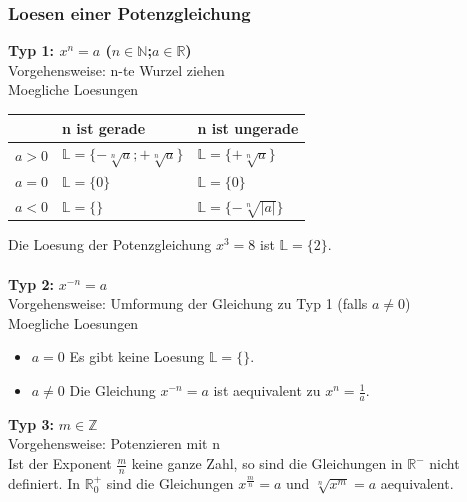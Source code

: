 \begin{multicols}{2}
    \subsubsection{Loesen einer Potenzgleichung}
    \vspace{-4mm}
    \textbf{Typ 1:  $x^n = a$ ($n \in \mathbb{N}$;$a \in \mathbb{R}$)} \\
    Vorgehensweise: n-te Wurzel ziehen\\
    Moegliche Loesungen \\
    \begin{tabularx}{0.5\textwidth} {
            | >{\raggedright\arraybackslash}c
            | >{\raggedright\arraybackslash}X
            | >{\raggedright\arraybackslash}X |}
        \hline
        \textbf{} & \textbf{n ist gerade}                        & \textbf{n ist ungerade}           \\ \hline
        $a > 0$   & $\mathbb{L} = \{-\sqrt[n]{a};+\sqrt[n]{a}\}$ & $\mathbb{L} = \{+\sqrt[n]{a}\}$   \\ \hline
        $a = 0$   & $\mathbb{L} = \{0\}$                         & $\mathbb{L} = \{0\}$              \\ \hline
        $a < 0$   & $\mathbb{L} = \{\}$                          & $\mathbb{L} = \{-\sqrt[n]{|a|}\}$ \\ \hline
    \end{tabularx}

    Die Loesung der Potenzgleichung $x^3 = 8$ ist $\mathbb{L} = \{2\}$.\\~\\
    \textbf{Typ 2:} $x^{-n} = a$\\
    Vorgehensweise: Umformung der Gleichung zu Typ 1 (falls $a \neq 0$)\\
    Moegliche Loesungen \\
    \begin{itemize}
        \item  $a = 0$ Es gibt keine Loesung $\mathbb{L} = \{\}$.
        \item  $a \neq 0$ Die Gleichung $x^{-n} = a$ ist aequivalent zu $x^n = \frac{1}{a}$.
    \end{itemize}
    \textbf{Typ 3:} $m \in \mathbb{Z}$ \\
    Vorgehensweise: Potenzieren mit n\\
    Ist der Exponent $\frac{m}{n}$ keine ganze Zahl, so sind die Gleichungen in $\mathbb{R}^{-}$ nicht definiert. In $\mathbb{R}_{0}^{+}$ sind die Gleichungen $x^{\frac{m}{n}} = a$ und $\sqrt[n]{x^m} = a$ aequivalent.\\


\end{multicols}
